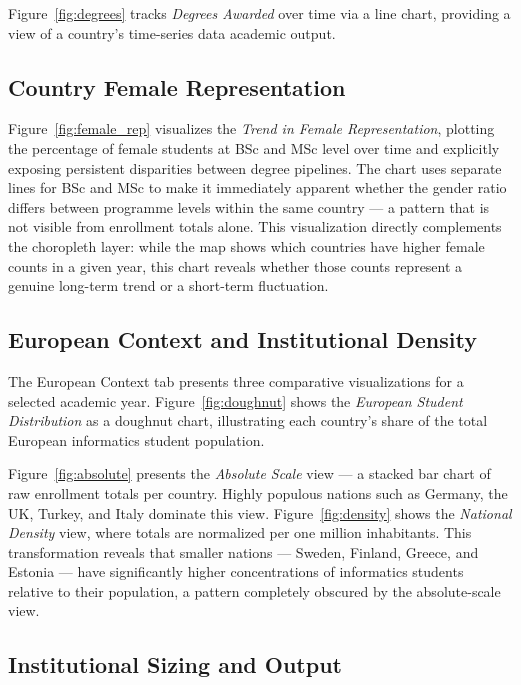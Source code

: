 \documentclass[final,3p,times,twocolumn]{elsarticle}
\begin{document}
Figure~\ref{fig:degrees} tracks \textit{Degrees Awarded} over time via a line chart, providing a view of a country's time-series data academic output. 

\subsection{Country Female Representation}

Figure~\ref{fig:female_rep} visualizes the \textit{Trend in Female Representation}, plotting the percentage of female students at BSc and MSc level over time and explicitly exposing persistent disparities between degree pipelines. The chart uses separate lines for BSc and MSc to make it immediately apparent whether the gender ratio differs between programme levels within the same country — a pattern that is not visible from enrollment totals alone. This visualization directly complements the choropleth layer: while the map shows which countries have higher female counts in a given year, this chart reveals whether those counts represent a genuine long-term trend or a short-term fluctuation.

\subsection{European Context and Institutional Density}

The European Context tab presents three comparative visualizations for a selected academic year. Figure~\ref{fig:doughnut} shows the \textit{European Student Distribution} as a doughnut chart, illustrating each country's share of the total European informatics student population.

Figure~\ref{fig:absolute} presents the \textit{Absolute Scale} view — a stacked bar chart of raw enrollment totals per country. Highly populous nations such as Germany, the UK, Turkey, and Italy dominate this view. Figure~\ref{fig:density} shows the \textit{National Density} view, where totals are normalized per one million inhabitants. This transformation reveals that smaller nations --- Sweden, Finland, Greece, and Estonia --- have significantly higher concentrations of informatics students relative to their population, a pattern completely obscured by the absolute-scale view.

\subsection{Institutional Sizing and Output}
\end{document}
